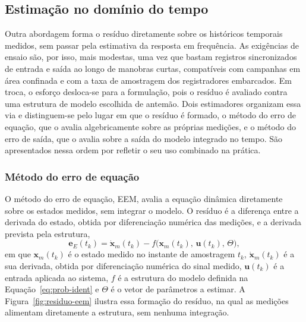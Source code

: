 {\subsection[{\color{blue}Estimação no domínio do tempo}]{{\color{blue}Estimação no domínio do tempo}}
\label{sec:met-tempo}

Outra abordagem forma o resíduo diretamente sobre os históricos temporais medidos, sem passar pela estimativa da resposta em frequência. As exigências de ensaio são, por isso, mais modestas, uma vez que bastam registros sincronizados de entrada e saída ao longo de manobras curtas, compatíveis com campanhas em área confinada e com a taxa de amostragem dos registradores embarcados. Em troca, o esforço desloca-se para a formulação, pois o resíduo é avaliado contra uma estrutura de modelo escolhida de antemão. Dois estimadores organizam essa via e distinguem-se pelo lugar em que o resíduo é formado, o método do erro de equação, que o avalia algebricamente sobre as próprias medições, e o método do erro de saída, que o avalia sobre a saída do modelo integrado no tempo. São apresentados nessa ordem por refletir o seu uso combinado na prática.

\subsubsection[{\color{blue}Método do erro de equação}]{{\color{blue}Método do erro de equação}}

O método do erro de equação, \gls{EEM}, avalia a equação dinâmica diretamente sobre os estados medidos, sem integrar o modelo. O resíduo é a diferença entre a derivada do estado, obtida por diferenciação numérica das medições, e a derivada prevista pela estrutura,
\begin{equation}
\mathbf{e}_{E}(t_k) = \dot{\mathbf{x}}_{m}(t_k) - f\big(\mathbf{x}_{m}(t_k),\,\mathbf{u}(t_k),\,\Theta\big),
\label{eq:eem-geral}
\end{equation}
em que $\mathbf{x}_m(t_k)$ é o estado medido no instante de amostragem $t_k$, $\dot{\mathbf{x}}_m(t_k)$ é a sua derivada, obtida por diferenciação numérica do sinal medido, $\mathbf{u}(t_k)$ é a entrada aplicada ao sistema, $f$ é a estrutura do modelo definida na Equação~\eqref{eq:prob-ident} e $\Theta$ é o vetor de parâmetros a estimar. A Figura~\ref{fig:residuo-eem} ilustra essa formação do resíduo, na qual as medições alimentam diretamente a estrutura, sem nenhuma integração.

}
